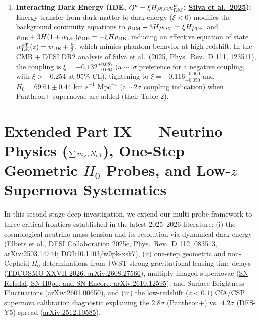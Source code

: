 \documentclass[aps,prd,preprint,superscriptaddress,nofootinbib]{revtex4-2}
\begin{document}
\begin{enumerate}
    \item \textbf{Interacting Dark Energy (IDE, $Q^\nu = \xi H \rho_{\rm DE} u^\nu_{\rm DM}$; \href{https://arxiv.org/abs/2503.23225}{Silva et al.\ 2025}):} Energy transfer from dark matter to dark energy ($\xi < 0$) modifies the background continuity equations to $\dot{\rho}_{\rm DM} + 3H\rho_{\rm DM} = \xi H \rho_{\rm DE}$ and $\dot{\rho}_{\rm DE} + 3H(1+w_{\rm DE})\rho_{\rm DE} = -\xi H \rho_{\rm DE}$, inducing an effective equation of state $w_{\rm DE}^{\rm eff}(z) = w_{\rm DE} + \frac{\xi}{3}$, which mimics phantom behavior at high redshift. In the CMB + DESI DR2 analysis of \href{https://arxiv.org/abs/2503.23225}{Silva et al.\ (2025, Phys.\ Rev.\ D 111, 123511)}, the coupling is $\xi = -0.132^{+0.087}_{-0.064}$ (a $\sim 1\sigma$ preference for a negative coupling, with $\xi > -0.254$ at 95\% CL), tightening to $\xi = -0.116^{+0.060}_{-0.050}$ and $H_0 = 69.61 \pm 0.44\text{ km s}^{-1}\text{ Mpc}^{-1}$ (a $\sim 2\sigma$ coupling indication) when Pantheon+ supernovae are added (their Table 2).
\end{enumerate}




\section{Extended Part IX --- Neutrino Physics ($\sum m_\nu, N_{\rm eff}$), One-Step Geometric $H_0$ Probes, and Low-$z$ Supernova Systematics}

In this second-stage deep investigation, we extend our multi-probe framework to three critical frontiers established in the latest 2025--2026 literature: (i) the cosmological neutrino mass tension and its resolution via dynamical dark energy (\href{https://arxiv.org/abs/2503.14744}{Elbers et al., DESI Collaboration 2025c, Phys.\ Rev.\ D 112, 083513, arXiv:2503.14744}; \href{https://link.aps.org/doi/10.1103/w9pk-xsk7}{DOI:10.1103/w9pk-xsk7}), (ii) one-step geometric and non-Cepheid $H_0$ determinations from JWST strong gravitational lensing time delays (\href{https://arxiv.org/abs/2608.27566}{TDCOSMO XXVII 2026, arXiv:2608.27566}), multiply imaged supernovae (\href{https://arxiv.org/html/2610.12595v1}{SN Refsdal, SN H0pe, and SN Encore, arXiv:2610.12595}), and Surface Brightness Fluctuations (\href{https://arxiv.org/pdf/2601.00650}{arXiv:2601.00650}), and (iii) the low-redshift ($z < 0.1$) CfA/CSP supernova calibration diagnostic explaining the $2.8\sigma$ (Pantheon+) vs.\ $4.2\sigma$ (DES-Y5) spread (\href{https://arxiv.org/abs/2512.10585}{arXiv:2512.10585}).
\end{document}

